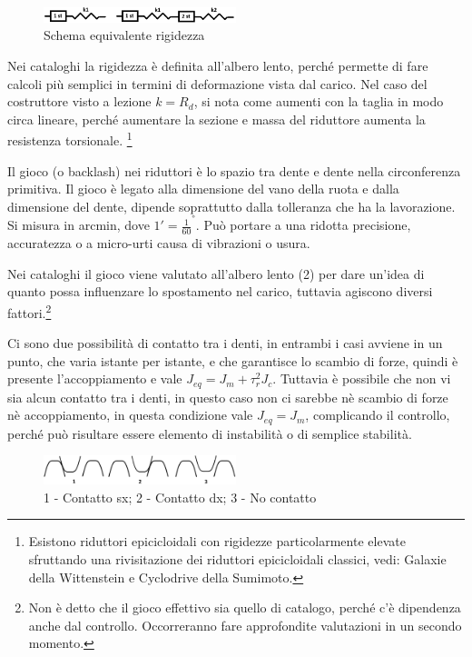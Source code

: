 \begin{figure}[h]
    \centering
    \includegraphics[width=0.5\textwidth]{Immagini/rigidezza_1_2_stadi.png}
    \caption{Schema equivalente rigidezza}
\end{figure}

Nei cataloghi la rigidezza è definita all'albero lento, perché permette di fare calcoli più semplici in termini di deformazione vista dal carico.
Nel caso del costruttore visto a lezione $k=R_d$, si nota come aumenti con la taglia in modo circa lineare, perché aumentare la sezione e massa del riduttore aumenta la resistenza torsionale. \footnote{Esistono riduttori epicicloidali con rigidezze particolarmente elevate sfruttando una rivisitazione dei riduttori epicicloidali classici, vedi: Galaxie della Wittenstein e Cyclodrive della Sumimoto.}

Il gioco (o backlash) nei riduttori è lo spazio tra dente e dente nella circonferenza primitiva. Il gioco è legato alla dimensione del vano della ruota e dalla dimensione del dente, dipende soprattutto dalla tolleranza che ha la lavorazione.
Si misura in arcmin, dove $1'=\frac{1}{60}^°$.
Può portare a una ridotta precisione, accuratezza o a micro-urti causa di vibrazioni o usura. 

Nei cataloghi il gioco viene valutato all'albero lento (2) per dare un'idea di quanto possa influenzare lo spostamento nel carico, tuttavia agiscono diversi fattori.\footnote{Non è detto che il gioco effettivo sia quello di catalogo, perché c'è dipendenza anche dal controllo. Occorreranno fare approfondite valutazioni in un secondo momento.}

Ci sono due possibilità di contatto tra i denti, in entrambi i casi avviene in un punto, che varia istante per istante, e che garantisce lo scambio di forze, quindi è presente l'accoppiamento e vale $J_{eq}=J_m+\tau_r^2 J_c$. 
Tuttavia è possibile che non vi sia alcun contatto tra i denti, in questo caso non ci sarebbe nè scambio di forze nè accoppiamento, in questa condizione vale $J_{eq}=J_m$, complicando il controllo, perché può risultare essere elemento di instabilità o di semplice stabilità.

\begin{figure}[h]
    \centering
    \includegraphics[width=0.5\textwidth]{Immagini/config_denti_gioco.png}
    \caption{1 - Contatto sx; 2 - Contatto dx; 3 - No contatto}
\end{figure}

